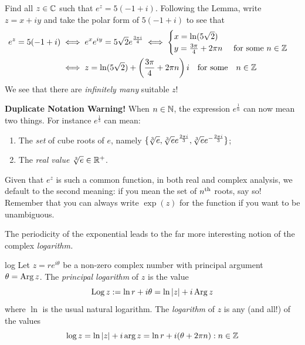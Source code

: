 \begin{example}{}{}
Find all $z\in\mathbb{C}$ such that $e^z=5(-1+i)$.\smallbreak
Following the Lemma, write $z=x+iy$ and take the polar form of $5(-1+i)$ to see that
\begin{align*}
e^z=5(-1+i)&\iff e^xe^{iy}=5\sqrt 2e^{\frac{3\pi i}{4}} \iff \begin{cases}
x=\ln(5\sqrt 2)\\
y=\frac{3\pi}4+2\pi n\quad\text{ for some }n\in\mathbb{Z}
\end{cases}\\
&\iff z=\ln(5\sqrt 2)+\left(\frac{3\pi}4+2\pi n\right)i\quad\text{for some}\quad n\in\mathbb{Z}
\end{align*}
We see that there are \emph{infinitely many} suitable $z$!
\end{example}
\goodbreak

\begin{aside}
{\bf Duplicate Notation Warning!}\quad
When $n\in\mathbb{N}$, the expression $e^{\frac 1n}$ can now mean two things. For instance $e^{\frac 13}$ can mean:
  \begin{enumerate}\itemsep0pt
    \item The \emph{set} of cube roots of $e$, namely $\{\sqrt[3]{e},\sqrt[3]{e}e^{\frac{2\pi i}{3}},\sqrt[3]{e}e^{-\frac{2\pi i}{3}}\}$;
    \item The \emph{real value} $\sqrt[3]{e}\in\mathbb{R}^+$.
  \end{enumerate}
  Given that $e^z$ is such a common function, in both real and complex analysis, we default to the second meaning: if you mean the set of $n\textsuperscript{th}$ roots, say so! Remember that you can always write $\exp(z)$ for the function if you want to be unambiguous.
\end{aside}



The periodicity of the exponential leads to the far more interesting notion of the complex \emph{logarithm.}

\begin{defn}{}{log}
Let $z=re^{i\theta}$ be a non-zero complex number with principal argument $\theta=\operatorname{Arg} z$. The \emph{principal logarithm} of $z$ is the value
\[\operatorname{Log} z:=\ln r+i\theta =\ln\left| z\right|+i\operatorname{Arg} z\]
where $\ln$ is the usual natural logarithm. The \emph{logarithm} of $z$ is any (and all!) of the values\footnotemark
\[\log z=\ln\left| z\right|+i\arg z=\ln r+i(\theta+2\pi n):n\in\mathbb{Z}\]
\end{defn}


